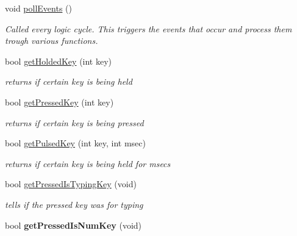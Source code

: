 \begin{DoxyCompactItemize}
\item 
\hypertarget{class_c_input_abbbdee718149717901aa21607d580c42}{
void \hyperlink{class_c_input_abbbdee718149717901aa21607d580c42}{pollEvents} ()}
\label{class_c_input_abbbdee718149717901aa21607d580c42}

\begin{DoxyCompactList}\small\item\em Called every logic cycle. This triggers the events that occur and process them trough various functions. \item\end{DoxyCompactList}\item 
bool \hyperlink{class_c_input_a34acaa475dda28d428b1ab0032d41014}{getHoldedKey} (int key)
\begin{DoxyCompactList}\small\item\em returns if certain key is being held \item\end{DoxyCompactList}\item 
bool \hyperlink{class_c_input_a4eef81156f58990d5c911cb2b1c7af1b}{getPressedKey} (int key)
\begin{DoxyCompactList}\small\item\em returns if certain key is being pressed \item\end{DoxyCompactList}\item 
bool \hyperlink{class_c_input_a5bd7ad2f5a50cdcc159d3dae929a563e}{getPulsedKey} (int key, int msec)
\begin{DoxyCompactList}\small\item\em returns if certain key is being held for msecs \item\end{DoxyCompactList}\item 
bool \hyperlink{class_c_input_a359ea2759f63f0b1e6dcae057467e5de}{getPressedIsTypingKey} (void)
\begin{DoxyCompactList}\small\item\em tells if the pressed key was for typing \item\end{DoxyCompactList}\item 
\hypertarget{class_c_input_a1ef2e445c30b86cf5c14117057912d76}{
bool {\bfseries getPressedIsNumKey} (void)}
\label{class_c_input_a1ef2e445c30b86cf5c14117057912d76}


\end{DoxyCompactItemize}

